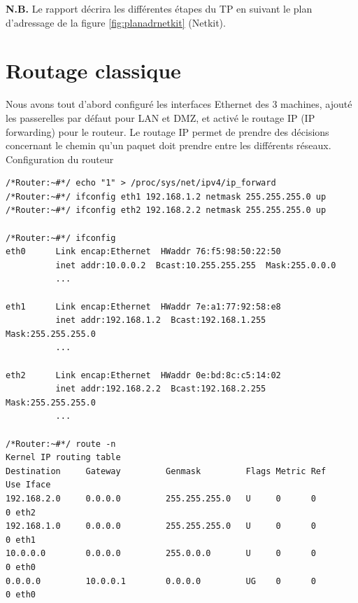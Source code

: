 \documentclass[frenchb, 11pt]{article}
\newlength{\leftbarwidth}
\newlength{\leftbarsep}
\newcommand*{\leftbarcolorcmd}{\color{leftbarcolor}} %
\renewenvironment{leftbar}{%
    \def\FrameCommand{{\leftbarcolorcmd{\vrule width \leftbarwidth\relax\hspace {\leftbarsep}}}}%
    \MakeFramed {\advance \hsize -\width \FrameRestore }%
}{%
    \endMakeFramed
}
\begin{document}
\noindent \textbf{N.B.} Le rapport décrira les différentes étapes du TP en suivant le plan d'adressage de la figure \ref{fig:planadrnetkit} (Netkit).


\newpage

\section{Routage classique}
Nous avons tout d'abord configuré les interfaces Ethernet des 3 machines, ajouté les passerelles par défaut pour LAN et DMZ, et activé le routage IP (IP forwarding) pour le routeur. Le routage IP permet de prendre des décisions concernant le chemin qu'un paquet doit prendre entre les différents réseaux.\\

\noindent Configuration du routeur
\begin{lstlisting}
/*Router:~#*/ echo "1" > /proc/sys/net/ipv4/ip_forward
/*Router:~#*/ ifconfig eth1 192.168.1.2 netmask 255.255.255.0 up
/*Router:~#*/ ifconfig eth2 192.168.2.2 netmask 255.255.255.0 up

/*Router:~#*/ ifconfig
eth0      Link encap:Ethernet  HWaddr 76:f5:98:50:22:50
          inet addr:10.0.0.2  Bcast:10.255.255.255  Mask:255.0.0.0
          ...

eth1      Link encap:Ethernet  HWaddr 7e:a1:77:92:58:e8
          inet addr:192.168.1.2  Bcast:192.168.1.255  Mask:255.255.255.0
          ...

eth2      Link encap:Ethernet  HWaddr 0e:bd:8c:c5:14:02
          inet addr:192.168.2.2  Bcast:192.168.2.255  Mask:255.255.255.0
          ...

/*Router:~#*/ route -n
Kernel IP routing table
Destination     Gateway         Genmask         Flags Metric Ref    Use Iface
192.168.2.0     0.0.0.0         255.255.255.0   U     0      0        0 eth2
192.168.1.0     0.0.0.0         255.255.255.0   U     0      0        0 eth1
10.0.0.0        0.0.0.0         255.0.0.0       U     0      0        0 eth0
0.0.0.0         10.0.0.1        0.0.0.0         UG    0      0        0 eth0
\end{lstlisting}
\hfill

\begin{leftbar}
\noindent %
\end{leftbar}
\end{document}
